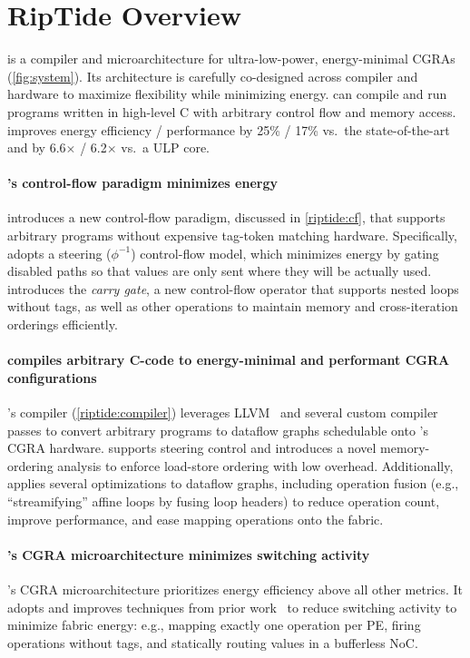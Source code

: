 \section{RipTide Overview}
\label{riptide:overview}

\figRipTideSystem

\riptide is a compiler and microarchitecture for ultra-low-power, energy-minimal CGRAs
(\autoref{fig:system}).
%
Its architecture is carefully co-designed across compiler and hardware
to maximize flexibility while minimizing energy.
% 
\riptide can compile and run programs written in high-level C with arbitrary control flow and memory access.
% 
\riptide improves energy efficiency / performance
by 25\% / 17\% vs.\ the
state-of-the-art~\cite{snafu} and by 6.6$\times$ / 6.2$\times$
vs.\ a ULP core.

\paragraph{\riptide's control-flow paradigm minimizes energy}
\riptide introduces a new control-flow paradigm, discussed in \autoref{riptide:cf}, that supports arbitrary programs without expensive tag-token matching hardware.
% 
Specifically, \riptide adopts a steering ($\phi^{-1}$) control-flow model, which minimizes energy by gating disabled paths so that values are only sent where they will be actually used.
% 
\riptide introduces the \emph{carry gate}, a new control-flow operator that supports nested loops without tags,
as well as other operations to maintain memory and cross-iteration orderings efficiently.
% 

\paragraph{\riptidecomp compiles arbitrary C-code to energy-minimal and performant CGRA configurations}
%
\riptide's compiler (\autoref{riptide:compiler}) leverages LLVM~\cite{llvm} and several
custom compiler passes to convert arbitrary programs to dataflow
graphs schedulable onto \riptide's CGRA hardware.
%
\riptidecomp supports steering control and introduces a novel
memory-ordering analysis to enforce load-store ordering with low
overhead.
% 
Additionally, \riptidecomp applies several optimizations to dataflow
graphs, including operation fusion (e.g., ``streamifying'' affine loops by fusing loop headers)
to reduce operation count, improve performance, and ease mapping operations onto the fabric.

\paragraph{\riptide's CGRA microarchitecture minimizes switching activity}
%
\riptide's CGRA microarchitecture prioritizes energy efficiency above all other metrics.
%
It adopts and improves techniques from prior work~\cite{snafu} to
reduce switching activity to minimize fabric energy:
%
e.g., mapping exactly one operation per PE,
firing operations without tags,
and statically routing values in a bufferless NoC.

